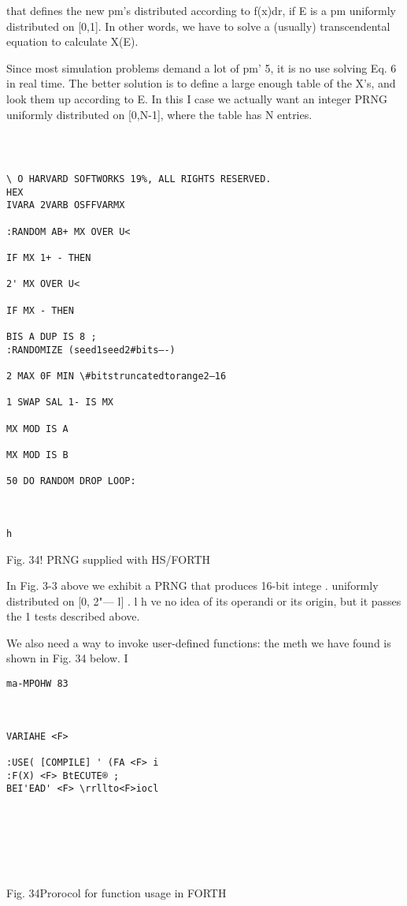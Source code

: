that defines the new pm's distributed according to f(x)dr, if E is a
pm uniformly distributed on [0,1]. In other words, we have to
solve a (usually) transcendental equation to calculate X(E).

Since most simulation problems demand a lot of pm’ 5, it is no use
solving Eq. 6 in real time. The better solution is to define a large
enough table of the X’s, and look them up according to E. In this I
case we actually want an integer PRNG uniformly distributed on
[0,N-1], where the table has N entries.

 
\begin{verbatim}

 

\ O HARVARD SOFTWORKS 19%, ALL RIGHTS RESERVED.
HEX
IVARA 2VARB OSFFVARMX

:RANDOM AB+ MX OVER U<

IF MX 1+ - THEN

2' MX OVER U<

IF MX - THEN

BIS A DUP IS 8 ;
:RANDOMIZE (seed1seed2#bits—-)

2 MAX 0F MIN \#bitstruncatedtorange2—16

1 SWAP SAL 1- IS MX

MX MOD IS A

MX MOD IS B

50 DO RANDOM DROP LOOP:

 

h
\end{verbatim}


Fig. 34! PRNG supplied with HS/FORTH

In Fig. 3-3 above we exhibit a PRNG that produces 16-bit intege .
uniformly distributed on [0, 2"— l] . l h ve no idea of its
operandi or its origin, but it passes the 1 tests described above.

We also need a way to invoke user-defined functions: the meth
we have found is shown in Fig. 34 below. I

\begin{verbatim}
ma-MPOHW 83

 

VARIAHE <F>

:USE( [COMPILE] ' (FA <F> i
:F(X) <F> BtECUTE® ;
BEI'EAD' <F> \rrllto<F>iocl

 

 

 
\end{verbatim}

Fig. 34Prorocol for function usage in FORTH

